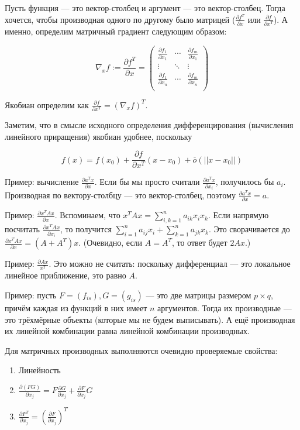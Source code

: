 \documentclass[12pt]{article}
\begin{document}
Пусть функция — это вектор-столбец и аргумент — это вектор-столбец. Тогда хочется, чтобы производная одного по другому было матрицей ($\frac {\partial f^T} {\partial x}$ или $\frac {\partial f} {\partial x^T}$). А именно, определим матричный градиент следующим образом:

\[
\nabla_x f := \frac {\partial f^T} {\partial x} =
\begin{pmatrix}
\frac {\partial f_1} {\partial x_1} & \cdots & \frac {\partial f_m} {\partial x_1} \\
\vdots & \ddots & \vdots \\
\frac {\partial f_1} {\partial x_n} & \cdots & \frac {\partial f_m} {\partial x_n} \\
\end{pmatrix}
\]

Якобиан определим как $\frac {\partial f} {\partial x^T} = (\nabla_x f)^T$.

Заметим, что в смысле исходного определения дифференцирования (вычисления линейного приращения) якобиан удобнее, поскольку

\[
f(x) = f(x_0) + \frac {\partial f} {\partial x^T} (x-x_0) + \overline{o}(||x-x_0||)
\]

Пример: вычисление $\frac {\partial a^T x} {\partial x}$. Если бы мы просто считали $\frac {\partial a^T x} {\partial x_i}$, получилось бы $a_i$. Производная по вектору-столбцу — это вектор-столбец, поэтому $\frac {\partial a^T x} {\partial x} = a$.

Пример: $\frac {\partial x^T A x} {\partial x}$. Вспоминаем, что $x^T A x = \sum_{i, k = 1}^n a_{ik} x_i x_k$. Если напрямую посчитать $\frac {\partial x^T A x} {\partial x_i}$, то получится $\sum_{i=1}^n a_{ij} x_i + \sum_{k=1}^n a_{jk} x_k$. Это сворачивается до $\frac {\partial x^T A x} {\partial x} = (A + A^T)x$. (Очевидно, если $A = A^T$, то ответ будет $2Ax$.)

Пример: $\frac {\partial Ax} {x^T}$. Это можно не считать: поскольку дифференциал — это локальное линейное приближение, это равно $A$.

Пример: пусть $F = (f_{is}), G = (g_{is})$ — это две матрицы размером $p \times q$, причём каждая из функций в них имеет $n$ аргументов. Тогда их производные — это трёхмёрные объекты (которые мы не будем выписывать). А ещё производная их линейной комбинации равна линейной комбинации производных.

Для матричных производных выполняются очевидно проверяемые свойства:

\begin{enumerate}
\item Линейность
\item $\frac {\partial (FG)} {\partial x_j} = F \frac {\partial G} {\partial x_j} + \frac {\partial F} {\partial x_j} G$
\item $\frac {\partial F^T} {\partial x_j} = \left( \frac {\partial F} {\partial x_j} \right)^T$
\end{enumerate}
\end{document}
